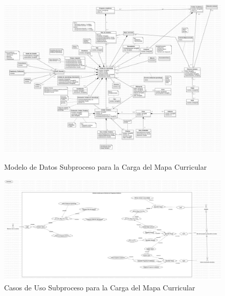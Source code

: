 \begin{figure}[htbp]
    \begin{center}
        \includegraphics[width=.95\textwidth]{C2-DR/SP4/Image/ModeloDeDatosjpg}
        \label{MDD}
        \caption{Modelo de Datos Subproceso para la  Carga del Mapa Curricular}
    \end{center}
\end{figure}

\begin{figure}[htbp]
	\begin{center}
		\includegraphics[width=.95\textwidth]{C2-DR/SP4/Image/CasosDeUso}
		\caption{Casos de Uso Subproceso para la  Carga del Mapa Curricular}
		\label{DCU-4}
	\end{center}
\end{figure}

